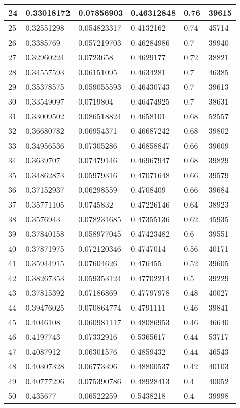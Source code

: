 \begin{longtable}{|l|l|l|l|l|l|}
24 & 0.33018172 & 0.07856903 & 0.46312848 & 0.76 & 39615 \\ \hline 
25 & 0.32551298 & 0.054823317 & 0.4132162 & 0.74 & 45714 \\ \hline 
26 & 0.3385769 & 0.057219703 & 0.46284986 & 0.7 & 39940 \\ \hline 
27 & 0.32960224 & 0.0723658 & 0.4629177 & 0.72 & 38821 \\ \hline 
28 & 0.34557593 & 0.06151095 & 0.4634281 & 0.7 & 46385 \\ \hline 
29 & 0.35378575 & 0.059055593 & 0.46430743 & 0.7 & 39613 \\ \hline 
30 & 0.33549097 & 0.0719804 & 0.46474925 & 0.7 & 38631 \\ \hline 
31 & 0.33009502 & 0.086518824 & 0.4658101 & 0.68 & 52557 \\ \hline 
32 & 0.36680782 & 0.06954371 & 0.46687242 & 0.68 & 39802 \\ \hline 
33 & 0.34956536 & 0.07305286 & 0.46858847 & 0.66 & 39609 \\ \hline 
34 & 0.3639707 & 0.07479146 & 0.46967947 & 0.68 & 39829 \\ \hline 
35 & 0.34862873 & 0.05979316 & 0.47071648 & 0.66 & 39579 \\ \hline 
36 & 0.37152937 & 0.06298559 & 0.4708409 & 0.66 & 39684 \\ \hline 
37 & 0.35771105 & 0.0745832 & 0.47226146 & 0.64 & 38923 \\ \hline 
38 & 0.3576943 & 0.078231685 & 0.47355136 & 0.62 & 45935 \\ \hline 
39 & 0.37840158 & 0.058977045 & 0.47423482 & 0.6 & 39551 \\ \hline 
40 & 0.37871975 & 0.072120346 & 0.4747014 & 0.56 & 40171 \\ \hline 
41 & 0.35944915 & 0.07604626 & 0.476455 & 0.52 & 39605 \\ \hline 
42 & 0.38267353 & 0.059353124 & 0.47702214 & 0.5 & 39229 \\ \hline 
43 & 0.37815392 & 0.07186869 & 0.47797978 & 0.48 & 40027 \\ \hline 
44 & 0.39476025 & 0.070864774 & 0.4791111 & 0.46 & 39841 \\ \hline 
45 & 0.4046108 & 0.060981117 & 0.48086953 & 0.46 & 46640 \\ \hline 
46 & 0.4197743 & 0.07332916 & 0.5365617 & 0.44 & 53717 \\ \hline 
47 & 0.4087912 & 0.06301576 & 0.4859432 & 0.44 & 46543 \\ \hline 
48 & 0.40307328 & 0.06773396 & 0.48800537 & 0.42 & 40103 \\ \hline 
49 & 0.40777296 & 0.075390786 & 0.48928413 & 0.4 & 40052 \\ \hline 
50 & 0.435677 & 0.06522259 & 0.5438218 & 0.4 & 39998 \\ \hline 
\end{longtable}